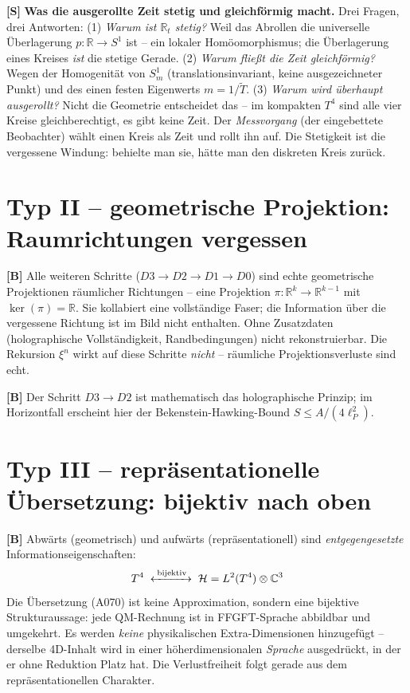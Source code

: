 \textbf{[S]} \textbf{Was die ausgerollte Zeit stetig und gleichförmig macht.}
Drei Fragen, drei Antworten: (1) \emph{Warum ist $\mathbb{R}_t$ stetig?} Weil das
Abrollen die universelle Überlagerung $p:\mathbb{R}\to S^1$ ist -- ein lokaler
Homöomorphismus; die Überlagerung eines Kreises \emph{ist} die stetige Gerade.
(2) \emph{Warum fließt die Zeit gleichförmig?} Wegen der Homogenität von $S^1_m$
(translationsinvariant, keine ausgezeichneter Punkt) und des einen festen Eigenwerts
$m=1/\tilde T$. (3) \emph{Warum wird überhaupt ausgerollt?} Nicht die Geometrie
entscheidet das -- im kompakten $T^4$ sind alle vier Kreise gleichberechtigt, es
gibt keine Zeit. Der \emph{Messvorgang} (der eingebettete Beobachter) wählt einen
Kreis als Zeit und rollt ihn auf. Die Stetigkeit ist die vergessene Windung: behielte
man sie, hätte man den diskreten Kreis zurück.

\section{Typ II -- geometrische Projektion: Raumrichtungen vergessen}

\textbf{[B]} Alle weiteren Schritte ($D3\to D2\to D1\to D0$) sind echte
geometrische Projektionen räumlicher Richtungen -- eine Projektion
$\pi:\mathbb{R}^k\to\mathbb{R}^{k-1}$ mit $\ker(\pi)=\mathbb{R}$. Sie kollabiert
eine vollständige Faser; die Information über die vergessene Richtung ist im Bild
nicht enthalten. Ohne Zusatzdaten (holographische Vollständigkeit,
Randbedingungen) nicht rekonstruierbar. Die Rekursion $\xi^n$ wirkt auf diese
Schritte \emph{nicht} -- räumliche Projektionsverluste sind echt.

\textbf{[B]} Der Schritt $D3\to D2$ ist mathematisch das holographische Prinzip;
im Horizontfall erscheint hier der Bekenstein-Hawking-Bound $S\le A/(4\ell_P^2)$.

\section{Typ III -- repräsentationelle Übersetzung: bijektiv nach oben}

\textbf{[B]} Abwärts (geometrisch) und aufwärts (repräsentationell) sind
\emph{entgegengesetzte} Informationseigenschaften:
\[
  T^4 \;\xleftrightarrow{\;\text{bijektiv}\;}\; \mathcal H = L^2(T^4)\otimes\mathbb{C}^3
\]
Die Übersetzung (A070) ist keine Approximation, sondern eine bijektive
Strukturaussage: jede QM-Rechnung ist in FFGFT-Sprache abbildbar und umgekehrt.
Es werden \emph{keine} physikalischen Extra-Dimensionen hinzugefügt -- derselbe
4D-Inhalt wird in einer höherdimensionalen \emph{Sprache} ausgedrückt, in der er
ohne Reduktion Platz hat. Die Verlustfreiheit folgt gerade aus dem
repräsentationellen Charakter.

